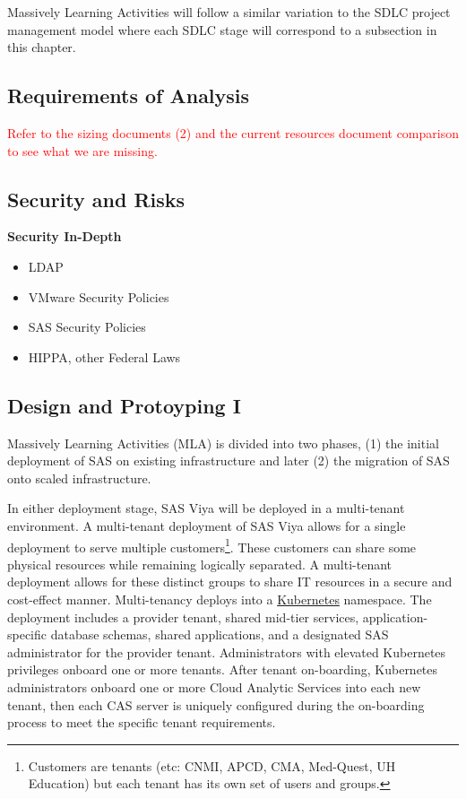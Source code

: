 Massively Learning Activities will follow a similar variation to the SDLC project management model where each SDLC stage will correspond to a subsection in this chapter. 

\subsection{Requirements of Analysis}
\textcolor{red}{Refer to the sizing documents (2) and the current resources document comparison to see what we are missing.}

\subsection{Security and Risks}
\textbf{Security In-Depth}
\begin{itemize}
    \item LDAP
    \item VMware Security Policies
    \item SAS Security Policies
    \item HIPPA, other Federal Laws
\end{itemize}

\subsection{Design and Protoyping I}
Massively Learning Activities (MLA) is divided into two phases, (1) the initial deployment of SAS on existing infrastructure and later (2) the migration of SAS onto scaled infrastructure. 

In either deployment stage, SAS Viya will be deployed in a multi-tenant environment. A multi-tenant deployment of SAS Viya allows for a single deployment to serve multiple customers\footnote{Customers are tenants (etc: CNMI, APCD, CMA, Med-Quest, UH Education) but each tenant has its own set of users and groups.}. These customers can share some physical resources while remaining logically separated. A multi-tenant deployment allows for these distinct groups to share IT resources in a secure and cost-effect manner. Multi-tenancy deploys into a \href{https://kubernetes.io/}{Kubernetes} namespace. The deployment includes a provider tenant, shared mid-tier services, application-specific database schemas, shared applications, and a designated SAS administrator for the provider tenant. Administrators with elevated Kubernetes privileges onboard one or more tenants. After tenant on-boarding, Kubernetes administrators onboard one or more Cloud Analytic Services into each new tenant, then each CAS server is uniquely configured during the on-boarding process to meet the specific tenant requirements. 

